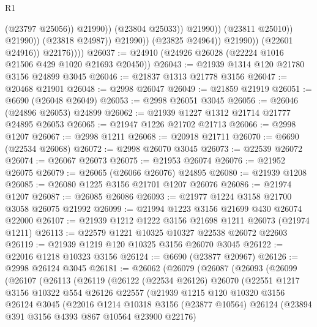 \begin{lexlean}{R1}
\begin{coremodule}
                                            (@23797 @25056))
                                          @21990))
                                      (@23804 @25033))
                                    @21990))
                                (@23811 @25010))
                              @21990))
                          (@23818 @24987))
                        @21990))
                    (@23825 @24964))
                  @21990))
              (@22601 @24916))
            @22176))))
@26037 := @24910 (@24926 @26028 (@22224 @1016 @21506 @429 @1020 @21693 @20450))
@26043 := @21939 @1314 @120 @21780 @3156 @24899 @3045
@26046 := @21837 @1313 @21778 @3156
@26047 := @20468 @21901
@26048 := @2998 @26047
@26049 := @21859 @21919
@26051 := @6690 (@26048 @26049)
@26053 := @2998 @26051 @3045
@26056 := @26046 (@24896 @26053) @24899
@26062 := @21939 @1227 @1312 @21714 @21777 @24895 @26053
@26065 := @21947 @1226 @21702 @21713
@26066 := @2998 @1207
@26067 := @2998 @1211
@26068 := @20918 @21711
@26070 := @6690 (@22534 @26068)
@26072 := @2998 @26070 @3045
@26073 := @22539 @26072
@26074 := @26067 @26073
@26075 := @21953 @26074
@26076 := @21952 @26075
@26079 := @26065 (@26066 @26076) @24895
@26080 := @21939 @1208
@26085 := @26080 @1225 @3156 @21701 @1207 @26076
@26086 := @21974 @1207
@26087 := @26085 @26086
@26093 := @21977 @1224 @3158 @21700 @3058 @26075 @21992
@26099 := @21994 @1223 @3156 @21699 @430 @26074 @22000
@26107 := @21939 @1212 @1222 @3156 @21698 @1211 @26073 (@21974 @1211)
@26113 := @22579 @1221 @10325 @10327 @22538 @26072 @22603
@26119 := @21939 @1219 @120 @10325 @3156 @26070 @3045
@26122 := @22016 @1218 @10323 @3156
@26124 := @6690 (@23877 @20967)
@26126 := @2998 @26124 @3045
@26181 := @26062
    (@26079
      (@26087
        (@26093
          (@26099
            (@26107
              (@26113
                (@26119
                  (@26122
                    (@22534 @26126)
                    @26070
                    (@22551
                      @1217
                      @3156
                      @10322
                      @554
                      @26126
                      @22557
                      (@21939
                        @1215
                        @120
                        @10320
                        @3156
                        @26124
                        @3045
                        (@22016
                          @1214
                          @10318
                          @3156
                          (@23877 @10564)
                          @26124
                          (@23894 @391 @3156 @4393 @867 @10564 @23900 @22176)

\end{coremodule}
\end{lexlean}
